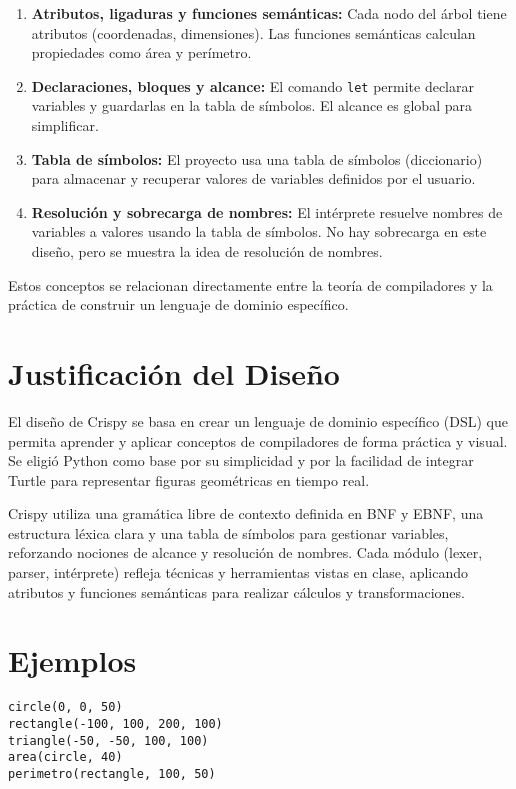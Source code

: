 \documentclass[12pt]{article}
\begin{document}
\begin{enumerate}
  \item \textbf{Atributos, ligaduras y funciones semánticas:} Cada nodo del árbol tiene atributos (coordenadas, dimensiones). Las funciones semánticas calculan propiedades como área y perímetro.

  \item \textbf{Declaraciones, bloques y alcance:} El comando \texttt{let} permite declarar variables y guardarlas en la tabla de símbolos. El alcance es global para simplificar.

  \item \textbf{Tabla de símbolos:} El proyecto usa una tabla de símbolos (diccionario) para almacenar y recuperar valores de variables definidos por el usuario.

  \item \textbf{Resolución y sobrecarga de nombres:} El intérprete resuelve nombres de variables a valores usando la tabla de símbolos. No hay sobrecarga en este diseño, pero se muestra la idea de resolución de nombres.
\end{enumerate}

Estos conceptos se relacionan directamente entre la teoría de compiladores y la práctica de construir un lenguaje de dominio específico.

\section{Justificación del Diseño}

El diseño de Crispy se basa en crear un lenguaje de dominio específico (DSL) que permita aprender y aplicar conceptos de compiladores de forma práctica y visual. Se eligió Python como base por su simplicidad y por la facilidad de integrar Turtle para representar figuras geométricas en tiempo real.

Crispy utiliza una gramática libre de contexto definida en BNF y EBNF, una estructura léxica clara y una tabla de símbolos para gestionar variables, reforzando nociones de alcance y resolución de nombres. Cada módulo (lexer, parser, intérprete) refleja técnicas y herramientas vistas en clase, aplicando atributos y funciones semánticas para realizar cálculos y transformaciones.

\section{Ejemplos}
\begin{verbatim}
circle(0, 0, 50)
rectangle(-100, 100, 200, 100)
triangle(-50, -50, 100, 100)
area(circle, 40)
perimetro(rectangle, 100, 50)
\end{verbatim}
\end{document}
